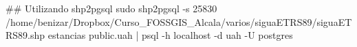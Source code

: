 \lstset{caption=Importación de estancias}
\begin{bash}
## Utilizando shp2pgsql
sudo shp2pgsql -s 25830 /home/benizar/Dropbox/Curso_FOSSGIS_Alcala/varios/siguaETRS89/siguaETRS89.shp  estancias public.uah  | psql -h localhost -d uah -U postgres
\end{bash}